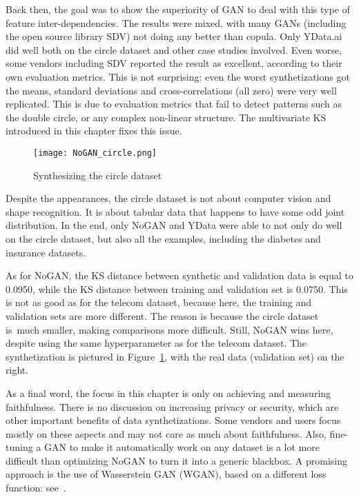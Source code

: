\documentclass[oneside,10pt]{book}
\begin{document}
Back then, the goal was to show the superiority of GAN to deal with this type of feature inter-dependencies. The results were mixed, with many GANs (including the open source library SDV) not doing any better than copula. Only YData.ai did well both on the circle dataset and other case studies involved.
Even worse, some vendors including SDV reported the result as excellent, according to their  own evaluation metrics. This is not surprising: even the worst synthetizations got the means, standard deviations and cross-correlations (all zero) were very well replicated. This is due to evaluation
 metrics that fail to detect patterns such as the double circle, or any complex non-linear structure. The multivariate KS introduced in this chapter fixes this issue.

\begin{figure}[H]
\centering
\texttt{[image: NoGAN\_circle.png]} %
\caption{Synthesizing the circle dataset}
\label{fig:nogancc}
\end{figure}



Despite the appearances, the circle dataset is not about computer vision and shape recognition. It is about tabular data
 that happens to have some odd joint distribution. In the end, only NoGAN and YData were able to not only do well  on  the circle dataset,
 but also all the  examples, including the diabetes and insurance datasets.

As for NoGAN, the KS distance between synthetic and validation data is equal to 0.0950, while the KS distance between training and validation set is 0.0750. This is not as good as for the telecom dataset, because here, the training and validation sets are more different. The reason is because the circle dataset is~much smaller, making comparisons more difficult. Still, NoGAN wins here, despite using the same hyperparameter as for the telecom dataset. The synthetization is pictured in Figure~\ref{fig:nogancc}, with the real data (validation set) on the right.

As a final word, the focus in this chapter is only on achieving and measuring faithfulness. There is no discussion on increasing privacy or security, which are other important benefits   of data synthetizations. Some vendors and users focus mostly on these aspects and may not care as much about faithfulness. Also, fine-tuning a GAN to make it automatically work on any dataset is a lot more difficult than optimizing NoGAN to turn it into
 a generic blackbox. A promising approach is the use of
\textcolor{index}{Wasserstein GAN} (WGAN), based on a different \textcolor{index}{loss function}: see~\cite{ieeewgan}.
\end{document}
